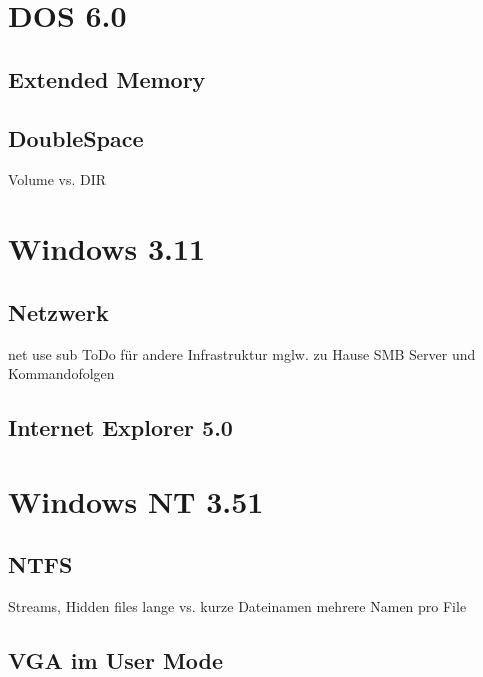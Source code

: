 \section{DOS 6.0}

	\subsection{Extended Memory}
	\subsection{DoubleSpace}

	Volume vs. DIR

\section{Windows 3.11}

	\subsection{Netzwerk}

	net use sub 
	ToDo für andere Infrastruktur mglw. zu Hause SMB Server und Kommandofolgen

	\subsection{Internet Explorer 5.0}

\section{Windows NT 3.51}

	\subsection{NTFS}
	Streams, Hidden files
	lange vs. kurze Dateinamen
	mehrere Namen pro File

	\subsection{VGA im User Mode}

